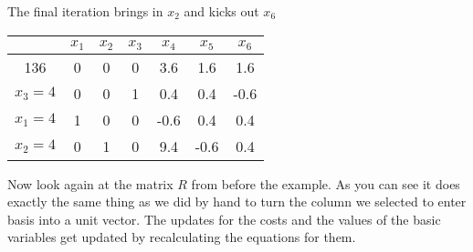 \begin{Ex}
The final iteration brings in $x_2$ and kicks out $x_6$

\begin{center}
\begin{tabular}{c|cccccc}
         & $x_1$ & $x_2$ & $x_3$ & $x_4$ & $x_5$ & $x_6$ \\\hline
136      & 0 & 0 & 0 & 3.6 & 1.6 & 1.6 \\\hline
$x_3=4$ & 0 & 0 & 1 & 0.4 & 0.4 & -0.6\\
$x_1=4$  & 1 & 0 & 0 & -0.6 & 0.4 & 0.4\\
$x_2=4$  & 0 & 1 & 0 & 9.4 & -0.6 & 0.4\\
\end{tabular}
\end{center}
\end{Ex}

Now look again at the matrix $R$ from before the example. As you can see it does exactly the same thing as we did by hand to turn the column we selected to enter basis into a unit vector. The updates for the costs and the values of the basic variables get updated by recalculating the equations for them.
